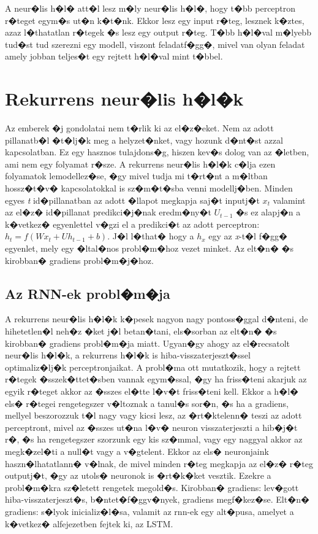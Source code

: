 \documentclass[12pt]{report}
\theoremstyle{definition}
\begin{document}
A neur�lis h�l� att�l lesz m�ly neur�lis h�l�, hogy t�bb perceptron r�teget egym�s ut�n k�t�nk. Ekkor lesz egy input r�teg, lesznek k�ztes, azaz l�thatatlan r�tegek �s lesz egy output r�teg. T�bb h�l�val m�lyebb tud�st tud szerezni egy modell, viszont feladatf�gg�, mivel van olyan feladat amely jobban teljes�t egy rejtett h�l�val mint t�bbel.

\section{Rekurrens neur�lis h�l�k}

Az emberek �j gondolatai nem t�rlik ki az el�z�eket. Nem az adott pillanatb�l 
�t�lj�k meg a helyzet�nket, vagy hozunk d�nt�st azzal kapcsolatban. Ez egy 
hasznos tulajdons�g, hiszen kev�s dolog van az �letben, ami nem egy folyamat 
r�sze. A rekurrens neur�lis h�l�k c�lja ezen folyamatok lemodellez�se, �gy 
mivel tudja mi t�rt�nt a m�ltban hossz�t�v� kapcsolatokkal is sz�m�t�sba venni 
modellj�ben. Minden egyes \textit{t} id�pillanatban az adott �llapot megkapja 
saj�t inputj�t $x_t$ valamint az el�z� id�pillanat predikci�j�nak eredm�ny�t
 $U_{t-1}$ �s ez alapj�n a k�vetkez� egyenlettel v�gzi el a predikci�t az adott 
 perceptron: $h_t = f(Wx_t + Uh_{t-1}+b)$. 
 J�l l�that� hogy a $h_x$ egy az \textit{x}-t�l f�gg� egyenlet, mely egy 
 �ltal�nos probl�m�hoz vezet minket. Az elt�n� �s kirobban� gradiens 
 probl�m�j�hoz.

\subsection{Az RNN-ek probl�m�ja}

A rekurrens neur�lis h�l�k k�pesek nagyon nagy pontoss�ggal d�nteni, de hihetetlen�l neh�z �ket j�l betan�tani, els�sorban az elt�n� �s kirobban� gradiens probl�m�ja miatt. Ugyan�gy ahogy az el�recsatolt neur�lis h�l�k, a rekurrens h�l�k is hiba-visszaterjeszt�ssel optimaliz�lj�k perceptronjaikat. A probl�ma ott mutatkozik, hogy a rejtett r�tegek �sszek�ttet�sben vannak egym�ssal, �gy ha friss�teni akarjuk az egyik r�teget akkor az �sszes el�tte l�v�t friss�teni kell. Ekkor a h�l� els� r�tegei rengetegszer v�ltoznak a tanul�s sor�n, �s ha a gradiens, mellyel beszorozzuk t�l nagy vagy kicsi lesz, az �rt�ktelenn� teszi az adott perceptront, mivel az �sszes ut�na l�v� neuron visszaterjeszti a hib�j�t r�, �s ha rengetegszer szorzunk egy kis sz�mmal, vagy egy naggyal akkor az megk�zel�ti a null�t vagy a v�gtelent. Ekkor az els� neuronjaink haszn�lhatatlann� v�lnak, de mivel minden r�teg megkapja az el�z� r�teg outputj�t, �gy az utols� neuronok is �rt�k�ket vesztik. Ezekre a probl�m�kra sz�letett rengetek megold�s. Kirobban� gradiens: lev�gott hiba-visszaterjeszt�s, b�ntet�f�ggv�nyek, gradiens megf�kez�se. Elt�n� gradiens: s�lyok inicializ�l�sa, valamit az rnn-ek egy alt�pusa, amelyet a k�vetkez� alfejezetben fejtek ki, az LSTM.
\end{document}
